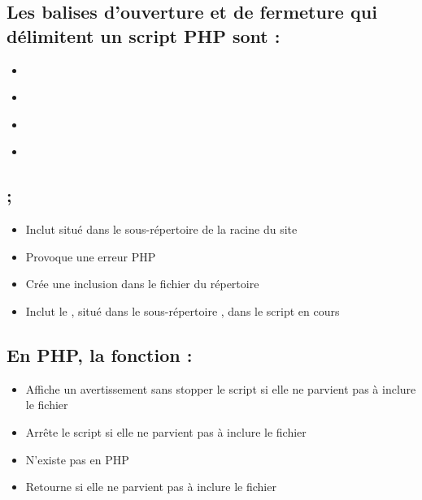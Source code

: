 \documentclass[11pt,a4paper]{article}
\begin{document}
\subsection{Les balises d'ouverture et de fermeture qui délimitent un script PHP sont :}

\begin{itemize}
\item[\CaseCoche]  \\
\item[\CaseCoche]  \\
\item[\CaseCoche]  \\
\item[\CaseCoche]  \\  %
\end{itemize}


\subsection{;}

\begin{itemize}
\item[\CaseCoche] Inclut  situé dans le sous-répertoire  de la racine du site \\
\item[\CaseCoche] Provoque une erreur PHP \\
\item[\CaseCoche] Crée une inclusion dans le fichier  du répertoire  \\
\item[\CaseCoche] Inclut le , situé dans le sous-répertoire , dans le script en cours \\  %
\end{itemize}


\subsection{En PHP, la fonction  :}

\begin{itemize}
\item[\CaseCoche] Affiche un avertissement sans stopper le script si elle ne parvient pas à inclure le fichier \\
\item[\CaseCoche] Arrête le script si elle ne parvient pas à inclure le fichier \\   %
\item[\CaseCoche] N'existe pas en PHP \\
\item[\CaseCoche] Retourne  si elle ne parvient pas à inclure le fichier \\
\end{itemize}
\end{document}
